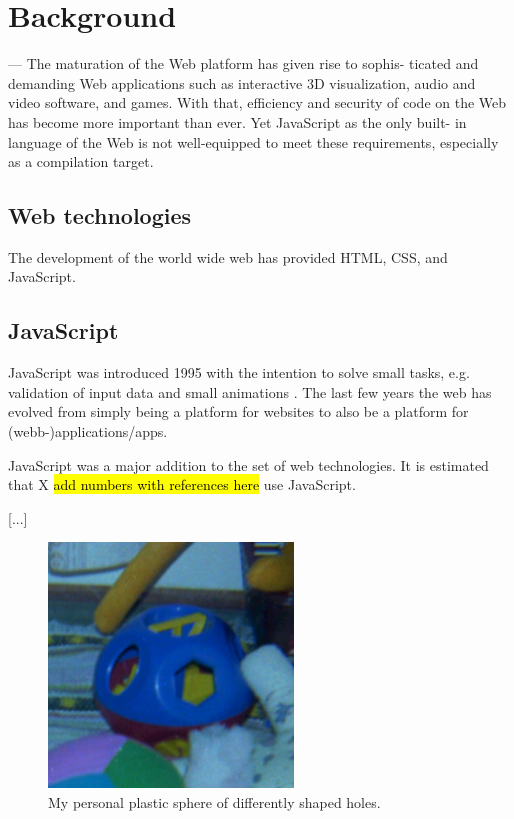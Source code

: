 \section{Background}

--- The maturation of the Web platform has given rise to sophis- ticated and demanding Web applications such as interactive 3D visualization, audio and video software, and games. With that, efficiency and security of code on the Web has become more important than ever. Yet JavaScript as the only built- in language of the Web is not well-equipped to meet these requirements, especially as a compilation target.



\subsection*{Web technologies}

The development of the world wide web has provided HTML, CSS, and JavaScript.

\subsection{JavaScript}

JavaScript was introduced 1995 with the intention to solve small tasks, e.g. validation of input data and small animations \parencite{Moller2018}. The last few years the web has evolved from simply being a platform for websites to also be a platform for (webb-)applications/apps.

JavaScript was a major addition to the set of web technologies. It is estimated that X \hl{add numbers with references here} use JavaScript.

[...]

\begin{figure}[!h]
\centering
\includegraphics[width=6.5cm,height=6.5cm,keepaspectratio]{toy}
\caption{My personal plastic sphere of differently shaped holes.}
\label{toy}
\end{figure}

